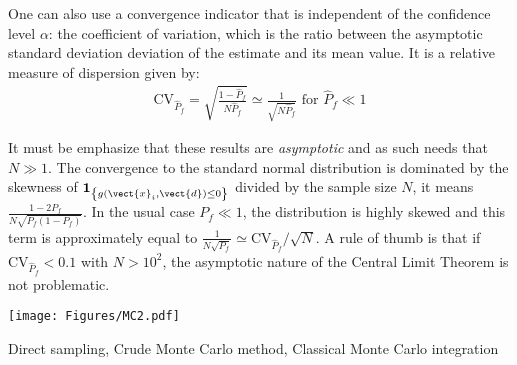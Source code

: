 {  One can also use a convergence indicator that is independent of the confidence level $\alpha$: the coefficient of variation, which is the ratio between the asymptotic standard deviation deviation of the estimate and its mean value. It is a relative measure of dispersion given by:
  \begin{align*}
    \textrm{CV}_{\widehat{P}_f}=\sqrt{ \frac{1-\widehat{P}_f}{N \widehat{P}_f}}\simeq\frac{1}{\sqrt{N\widehat{P}_f}}\mbox{ for }\widehat{P}_f\ll 1
  \end{align*}


  It must be emphasize that these results are \emph{asymptotic} and as such needs that $N\gg 1$. The convergence to the standard normal distribution is dominated by the skewness of $\mathbf{1}_{ \left\{ g(\vect{x}_i,\vect{d}) \leq 0 \right\} }$ divided by the sample size $N$, it means $\frac{1-2P_f}{N\sqrt{P_f(1-P_f)}}$. In the usual case $P_f\ll 1$, the distribution is highly skewed and this term is approximately equal to $\frac{1}{N\sqrt{P_f}}\simeq\textrm{CV}_{\widehat{P}_f}/\sqrt{N}$. A rule of thumb is that if $\textrm{CV}_{\widehat{P}_f}<0.1$ with $N>10^2$, the asymptotic nature of the Central Limit Theorem is not problematic.

  \begin{center}
    \texttt{[image: Figures/MC2.pdf]}
  \end{center}
}
{
  Direct sampling, Crude Monte Carlo method, Classical Monte Carlo integration
}

